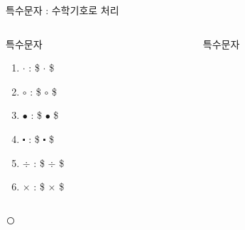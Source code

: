 \documentclass[ aspectratio=149,  10pt,blue,xcolor=pdftex,dvipsnames,table,handout,notes]{beamer}
\begin{document}
		\begin{frame}[t]{특수문자 : 수학기호로 처리 }

			\begin{columns}[t]
			\begin{column}{.4\textwidth}
			\begin{block} {특수문자}
			\begin{enumerate}
			\item $\cdot$ 		: \$ $\cdot$ \$ \\
			\item $\circ$ 		: \$ $\circ$ \$ \\
			\item $\bullet$ 		: \$ $\bullet$ \$ \\
			\item $\centerdot$		: \$ $\centerdot$ \$ \\
			\item $\div$ 			: \$ $\div$ \$ \\
			\item $\times$ 		: \$ $\times$ \$ \\
			\end{enumerate}
			\end{block}
			\end{column}

			\begin{column}{.4\textwidth}
			\begin{block} {특수문자}
			\end{block}
			\end{column}
			\end{columns}


			\textcircled{\small}\\


		\end{frame}
\end{document}
